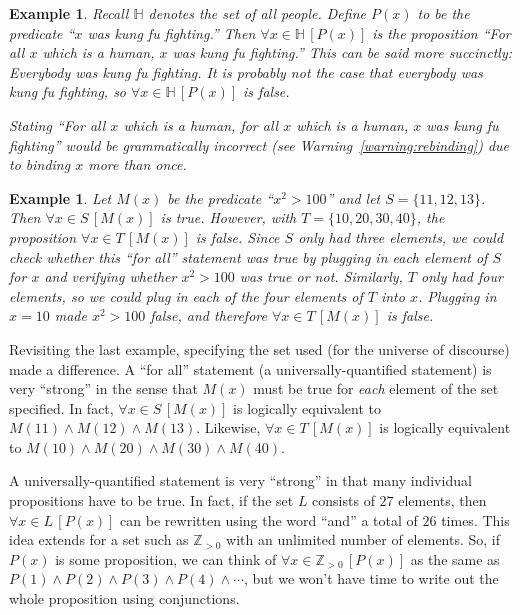 \documentclass{book}
\newcounter{ekcounter}%
\theoremstyle{ekimcustom}
\newtheorem{example}[ekcounter]{Example}
\begin{document}
\begin{example}\label{example:kung-fu-fighting}
Recall $\mathbb{H}$ denotes the set of all people. Define $P(x)$ to be the predicate ``$x$ was kung fu fighting.'' Then $\forall x \in \mathbb{H}\,[P(x)]$ is the proposition ``For all $x$ which is a human, $x$ was kung fu fighting.'' This can be said more succinctly: Everybody was kung fu fighting. It is probably not the case that \emph{everybody} was kung fu fighting, so $\forall x \in \mathbb{H}\,[P(x)]$ is false.

Stating ``For all $x$ which is a human, for all $x$ which is a human, $x$ was kung fu fighting'' would be grammatically incorrect (see Warning~\ref{warning:rebinding}) due to binding $x$ more than once. 
\end{example}
\begin{example}
Let $M(x)$ be the predicate ``$x^2 > 100$'' and let $S = \{11,12,13\}$. Then $\forall x \in S\,[M(x)]$ is true. However, with $T = \{10,20,30,40\}$, the proposition $\forall x \in T\,[M(x)]$ is false. Since $S$ only had three elements, we could check whether this ``for all'' statement was true by plugging in each element of $S$ for $x$ and verifying whether $x^2 > 100$ was true or not. Similarly, $T$ only had four elements, so we could plug in each of the four elements of $T$ into $x$. Plugging in $x=10$ made $x^2>100$ false, and therefore $\forall x \in T\,[M(x)]$ is false.
\end{example}
\begin{bremark}{}{}
Revisiting the last example, specifying the set used (for the universe of discourse) made a difference. A ``for all'' statement (a universally-quantified statement) is very ``strong'' in the sense that $M(x)$ must be true for \emph{each} element of the set specified.
\vskip6pt
In fact, $\forall x \in S\,[M(x)]$ is logically equivalent to $M(11) \wedge M(12) \wedge M(13)$. Likewise, $\forall x \in T\,[M(x)]$ is logically equivalent to $M(10) \wedge M(20) \wedge M(30) \wedge M(40)$.
\end{bremark}
A universally-quantified statement is very ``strong'' in that many individual propositions have to be true. In fact, if the set $L$ consists of $27$ elements, then $\forall x \in L\,[P(x)]$ can be rewritten using the word ``and'' a total of $26$ times. This idea extends for a set such as $\mathbb{Z}_{>0}$ with an unlimited number of elements. So, if $P(x)$ is some proposition, we can think of $\forall x \in \mathbb{Z}_{>0}\,[P(x)]$ as the same as $P(1) \wedge P(2) \wedge P(3) \wedge P(4) \wedge \cdots$, but we won't have time to write out the whole proposition using conjunctions.
\end{document}
